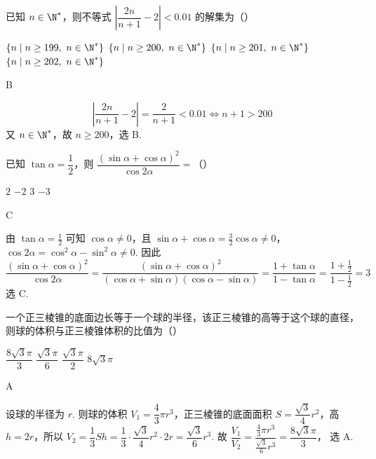 \begin{problem}
已知 \(n\in \N^*\)，则不等式 \(\left|\dfrac{2n}{n+1}-2\right|<0.01\) 的解集为（\quad）

\choices
    {\(\{n\mid n\ge199,\ n\in \N^*\}\)}
    {\(\{n\mid n\ge200,\ n\in \N^*\}\)}
    {\(\{n\mid n\ge201,\ n\in \N^*\}\)}
    {\(\{n\mid n\ge202,\ n\in \N^*\}\)}
\end{problem}

\begin{answer}
B
\end{answer}

\begin{solution}
\[\left|\frac{2n}{n+1}-2\right|=\frac{2}{n+1}<0.01\iff n+1>200\]
又 \(n\in \N^*\)，故 \(n\ge200\)，选 B.
\end{solution}

\begin{problem}
已知 \(\tan\alpha=\dfrac12\)，则 \(\dfrac{(\sin\alpha+\cos\alpha)^2}{\cos2\alpha}=\)（\quad）

\choices
    {\(2\)}
    {\(-2\)}
    {\(3\)}
    {\(-3\)}
\end{problem}

\begin{answer}
C
\end{answer}

\begin{solution}
由 \(\tan\alpha=\frac12\) 可知 \(\cos\alpha\ne0\)，且
\(\sin\alpha+\cos\alpha=\frac32\cos\alpha\ne0\)，
\(\cos2\alpha=\cos^2\alpha-\sin^2\alpha\ne0\). 因此
\[
\frac{(\sin\alpha+\cos\alpha)^2}{\cos2\alpha}
=\frac{(\sin\alpha+\cos\alpha)^2}{(\cos\alpha+\sin\alpha)(\cos\alpha-\sin\alpha)}
=\frac{1+\tan\alpha}{1-\tan\alpha}
=\frac{1+\frac12}{1-\frac12}=3
\]
选 C.
\end{solution}

\begin{problem}
一个正三棱锥的底面边长等于一个球的半径，该正三棱锥的高等于这个球的直径，则球的体积与正三棱锥体积的比值为（\quad）

\choices
    {\(\dfrac{8\sqrt3\pi}{3}\)}
    {\(\dfrac{\sqrt3\pi}{6}\)}
    {\(\dfrac{\sqrt3\pi}{2}\)}
    {\(8\sqrt3\pi\)}
\end{problem}

\begin{answer}
A
\end{answer}

\begin{solution}
设球的半径为 \(r\). 则球的体积 \(V_1=\dfrac43\pi r^3\)，正三棱锥的底面面积 \(S=\dfrac{\sqrt3}{4}r^2\)，高 \(h=2r\)，所以 \(V_2=\dfrac13Sh=\dfrac13\cdot\dfrac{\sqrt3}{4}r^2\cdot2r=\dfrac{\sqrt3}{6}r^3\).
故 \(\dfrac{V_1}{V_2}=\dfrac{\frac43\pi r^3}{\frac{\sqrt3}{6}r^3}=\dfrac{8\sqrt3\pi}{3}\)，
选 A.
\end{solution}


